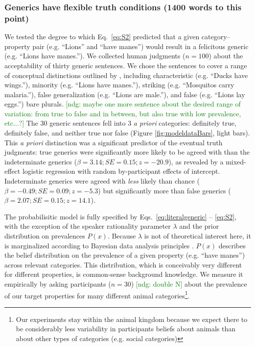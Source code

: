 \documentclass[10pt,letterpaper]{article}
\newcommand{\ndg}[1]{\textcolor{Green}{[ndg: #1]}}
\begin{document}
\subsubsection{Generics have flexible truth conditions (1400 words to this point)} 

We tested the degree to which Eq.~\eqref{eq:S2} predicted that a given category--property pair (e.g. ``Lions'' and ``have manes'') would result in a felicitous generic (e.g. ``Lions have manes.''). 
We collected human judgments ($n=100$) about the acceptability of thirty generic sentences. 
We chose the sentences to cover a range of conceptual distinctions outlined by , including characteristic (e.g. ``Ducks have wings.''), minority (e.g. ``Lions have manes.''), striking (e.g. ``Mosquitos carry malaria.''), false generalization (e.g. ``Lions are male.''), and false (e.g. ``Lions lay eggs.'') bare plurals.
\ndg{maybe one more sentence about the desired range of variation: from true to false and in between, but also true with low prevalence, etc...?}
%
The 30 generic sentences fell into 3 \emph{a priori} categories: definitely true, definitely false, and neither true nor false (Figure \ref{fig:modeldataBars}, light bars). 
This \emph{a priori} distinction was a significant predictor of the eventual truth judgments: true generics were significantly more likely to be agreed with than the indeterminate generics ($\beta = 3.14; SE = 0.15; z = -20.9$), as revealed by a mixed-effect logistic regression with random by-participant effects of intercept.
Indeterminate generics were agreed with \emph{less} likely than chance ($\beta = -0.49; SE = 0.09; z = -5.3$) but significantly more than false generics ($\beta = 2.07; SE = 0.15; z = 14.1$).


The probabilisitic model is fully specified by Eqs.~\eqref{eq:literalgeneric} -- \eqref{eq:S2}, with the exception of the speaker rationality parameter $\lambda$ and the prior distribution on prevalences $P(x)$. Because $\lambda$ is not of theoretical interest here, it is marginalized according to Bayesian data analysis principles \cite{??}. 
 $P(x)$ describes the belief distribution on the prevalence of a given property (e.g. ``have manes'') across relevant categories. 
 This distribution, which is conceivably very different for different properties, is common-sense background knowledge. 
 We measure it empirically by asking participants ($n=30$) \ndg{double N} about the prevalence of our target properties for many different animal categories\footnote{Our experiments stay within the animal kingdom because we expect there to be considerably less variability in participants beliefs about animals than about other types of categories (e.g. social categories)}. 
 
\end{document}
